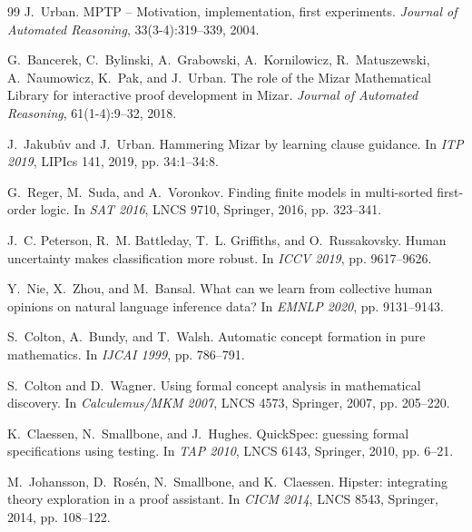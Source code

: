 \documentclass[]{article}
\begin{document}
\begin{thebibliography}{99}
J.~Urban.
\newblock MPTP -- Motivation, implementation, first experiments.
\newblock \emph{Journal of Automated Reasoning}, 33(3-4):319--339, 2004.

G.~Bancerek, C.~Bylinski, A.~Grabowski, A.~Kornilowicz, R.~Matuszewski, A.~Naumowicz,
K.~Pak, and J.~Urban.
\newblock The role of the Mizar Mathematical Library for interactive proof
development in Mizar.
\newblock \emph{Journal of Automated Reasoning}, 61(1-4):9--32, 2018.

J.~Jakub\r{u}v and J.~Urban.
\newblock Hammering Mizar by learning clause guidance.
\newblock In \emph{ITP 2019}, LIPIcs 141, 2019, pp. 34:1--34:8.

G.~Reger, M.~Suda, and A.~Voronkov.
\newblock Finding finite models in multi-sorted first-order logic.
\newblock In \emph{SAT 2016}, LNCS 9710, Springer, 2016, pp. 323--341.

J.~C. Peterson, R.~M. Battleday, T.~L. Griffiths, and O.~Russakovsky.
\newblock Human uncertainty makes classification more robust.
\newblock In \emph{ICCV 2019}, pp. 9617--9626.

Y.~Nie, X.~Zhou, and M.~Bansal.
\newblock What can we learn from collective human opinions on natural language
inference data?
\newblock In \emph{EMNLP 2020}, pp. 9131--9143.

S.~Colton, A.~Bundy, and T.~Walsh.
\newblock Automatic concept formation in pure mathematics.
\newblock In \emph{IJCAI 1999}, pp. 786--791.

S.~Colton and D.~Wagner.
\newblock Using formal concept analysis in mathematical discovery.
\newblock In \emph{Calculemus/MKM 2007}, LNCS 4573, Springer, 2007, pp. 205--220.

K.~Claessen, N.~Smallbone, and J.~Hughes.
\newblock QuickSpec: guessing formal specifications using testing.
\newblock In \emph{TAP 2010}, LNCS 6143, Springer, 2010, pp. 6--21.

M.~Johansson, D.~Ros\'en, N.~Smallbone, and K.~Claessen.
\newblock Hipster: integrating theory exploration in a proof assistant.
\newblock In \emph{CICM 2014}, LNCS 8543, Springer, 2014, pp. 108--122.

\end{thebibliography}
\end{document}
